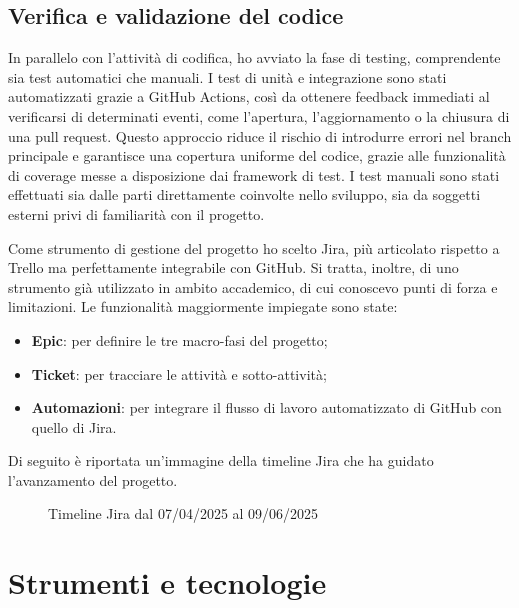 \subsection{Verifica e validazione del codice}

\par In parallelo con l’attività di codifica, ho avviato la fase di testing, comprendente sia test automatici che manuali. I test di unità e integrazione sono stati automatizzati grazie a GitHub Actions, così da ottenere feedback immediati al verificarsi di determinati eventi, come l’apertura, l’aggiornamento o la chiusura di una pull request. Questo approccio riduce il rischio di introdurre errori nel branch principale e garantisce una copertura uniforme del codice, grazie alle funzionalità di coverage messe a disposizione dai framework di test. I test manuali sono stati effettuati sia dalle parti direttamente coinvolte nello sviluppo, sia da soggetti esterni privi di familiarità con il progetto.

\vspace{20pt}
\par\noindent Come strumento di gestione del progetto ho scelto Jira, più articolato rispetto a Trello ma perfettamente integrabile con GitHub. Si tratta, inoltre, di uno strumento già utilizzato in ambito accademico, di cui conoscevo punti di forza e limitazioni. Le funzionalità maggiormente impiegate sono state:
\begin{itemize}
  \item \textbf{Epic}: per definire le tre macro-fasi del progetto;
  \item \textbf{Ticket}: per tracciare le attività e sotto-attività;
  \item \textbf{Automazioni}: per integrare il flusso di lavoro automatizzato di GitHub con quello di Jira.
\end{itemize}

\par\noindent Di seguito è riportata un’immagine della timeline Jira che ha guidato l’avanzamento del progetto.

\begin{figure}[H]
  \centering 
  \caption{Timeline Jira dal 07/04/2025 al 09/06/2025}
\end{figure}

\section{Strumenti e tecnologie}
\label{sec:strumenti-tecnologie}

